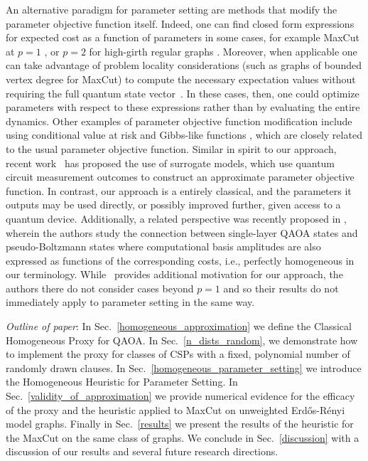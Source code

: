 \documentclass[superscriptaddress,pra,aps,10pt,longbibliography,notitlepage]{revtex4-1}
\begin{document}
An alternative paradigm for parameter setting are methods that modify the parameter objective function itself. Indeed, one can find closed form expressions for expected cost as a function of parameters in some cases, for example MaxCut at $p=1$ \cite{wang18}, or $p=2$ for high-girth regular graphs \cite{marwaha21}. Moreover, when applicable one can take advantage of problem locality considerations (such as graphs of bounded vertex degree for MaxCut) to compute the necessary expectation values without requiring the full quantum state vector~\cite{farhi14,wang18}. In these cases, then, one could optimize parameters with respect to these expressions rather than by evaluating the entire dynamics. Other examples of parameter objective function modification include using conditional value at risk \cite{barkoutsos20} and Gibbs-like functions \cite{li20}, which are closely related to the usual parameter objective function. Similar in spirit to our approach, recent work~\cite{sung2020using,shaffer22,mueller2022accelerating} has proposed the use of surrogate models, which use quantum circuit measurement outcomes to construct an approximate parameter objective function. In contrast, our approach is a entirely classical, and the parameters it outputs may be used directly, or possibly improved further, given access to a quantum device. Additionally, a related perspective was recently proposed in \cite{DiezValle22}, wherein the authors study the connection between single-layer QAOA states and pseudo-Boltzmann states where computational basis amplitudes are also expressed as functions of the corresponding costs, i.e., perfectly homogeneous in our terminology. While~\cite{DiezValle22} provides additional motivation for our approach, the authors there do not consider cases beyond $p=1$ and so their results do not immediately apply to parameter setting in the same way. 

\emph{Outline of paper}: In Sec.~\ref{homogeneous_approximation} we define the Classical Homogeneous Proxy for QAOA. In Sec.~\ref{n_dists_random}, we demonstrate how to implement the proxy for classes of CSPs with a fixed, polynomial number of randomly drawn clauses. In Sec.~\ref{homogeneous_parameter_setting} we introduce the Homogeneous Heuristic for Parameter Setting. In Sec.~\ref{validity_of_approximation} we provide numerical evidence for the efficacy of the proxy and the heuristic applied to MaxCut on unweighted Erd\H{o}s-R\'{e}nyi model graphs. Finally in Sec.~\ref{results} we present the results of the heuristic for the MaxCut on the same class of graphs. We conclude in Sec.~\ref{discussion} with a discussion of our results and several future research directions. 
\end{document}
